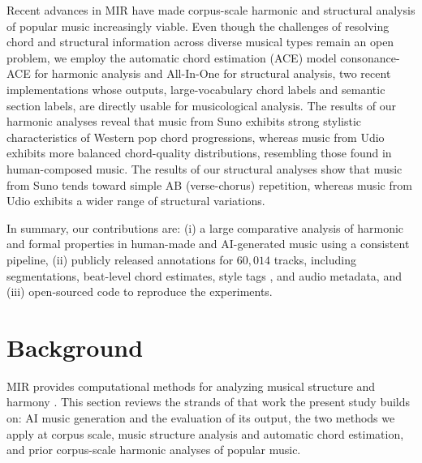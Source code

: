 \documentclass{article}
\begin{document}
Recent advances in MIR have made corpus-scale harmonic and structural analysis of popular music increasingly viable. Even though the challenges of resolving chord and structural information across diverse musical types remain an open problem, we employ the automatic chord estimation (ACE) model consonance-ACE \citep{poltronieri2025discord} for harmonic analysis and All-In-One \citep{taejun2023allinone} for structural analysis, two recent implementations whose outputs, large-vocabulary chord labels and semantic section labels, are directly usable for musicological analysis. The results of our harmonic analyses reveal that music from Suno exhibits strong stylistic characteristics of Western pop chord progressions, whereas music from Udio exhibits more balanced chord-quality distributions, resembling those found in human-composed music. The results of our structural analyses show that music from Suno tends toward simple AB (verse-chorus) repetition, whereas music from Udio exhibits a wider range of structural variations.

In summary, our contributions are:
(i) a large comparative analysis of harmonic and formal properties in human-made and AI-generated music using a consistent pipeline,
(ii) publicly released annotations for $60,014$ tracks, including segmentations, beat-level chord estimates, style tags \citep{oramas2018multimodal}, and audio metadata, and (iii) open-sourced code to reproduce the experiments.

\section{Background}
\label{sec:background}

MIR provides computational methods for analyzing musical structure and harmony \citep{Muller2015a}. This section reviews the strands of that work the present study builds on: AI music generation and the evaluation of its output, the two methods we apply at corpus scale, music structure analysis and automatic chord estimation, and prior corpus-scale harmonic analyses of popular music.
\end{document}
